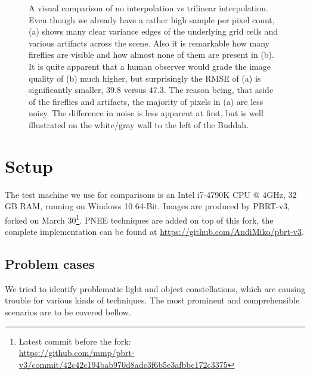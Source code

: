 \begin{figure}
\caption{A visual comparison of no interpolation vs trilinear interpolation. Even though we already have a rather high sample per pixel count, (a) shows many clear variance edges of the underlying grid cells and various artifacts across the scene. Also it is remarkable how many fireflies are visible and how almost none of them are present in (b). It is quite apparent that a human observer would grade the image quality of (b) much higher, but surprisingly the RMSE of (a) is significantly smaller, $39.8$ versus $47.3$. The reason being, that aside of the fireflies and artifacts, the majority of pixels in (a) are less noisy. The difference in noise is less apparent at first, but is well illustrated on the white/gray wall to the left of the Buddah.}
\label{fig:intComparison}
\end{figure}


\section{Setup}

The test machine we use for comparisons is an Intel i7-4790K CPU @ 4GHz, 32 GB RAM, running on Windows 10 64-Bit. Images are produced by PBRT-v3, forked on March 30\footnote{Latest commit before the fork: \\ \url{https://github.com/mmp/pbrt-v3/commit/42c42c194bab970d8adc3f6b5e3afbbc172c3375}}. PNEE techniques are added on top of this fork, the complete implementation can be found at \url{https://github.com/AndiMiko/pbrt-v3}.

\subsection{Problem cases}

We tried to identify problematic light and object constellations, which are causing trouble for various kinds of techniques. The most prominent and comprehensible scenarios are to be covered bellow. 

